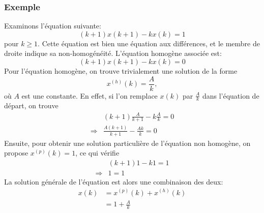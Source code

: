             \subsubsection{Exemple}
                Examinons l’équation suivante:
                \begin{equation}
                    (k+1)x(k+1)-kx(k) = 1
                \end{equation}
                pour $k \geq 1$. Cette équation est bien une équation aux différences, et le membre de droite indique sa non-homogénéité.
                L'équation homogène associée est:
                \begin{equation}
                    (k+1)x(k+1)-kx(k) = 0
                \end{equation}
                Pour l'équation homogène, on trouve trivialement une solution de la forme
                \begin{equation}
                    x^{(h)}(k) = \frac{A}{k},
                \end{equation}
                où $A$ est une constante. En effet, si l'on remplace $x(k)$ par $ \frac{A}{k}$ dans l'équation de départ, on trouve
                \begin{equation}
                    \begin{split}
                        &(k+1)\frac{A}{k+1}-k \frac{A}{k} = 0\\
                        \Rightarrow&\frac{A(k+1)}{k+1}-\frac{Ak}{k} = 0
                    \end{split}
                \end{equation}
                Ensuite, pour obtenir une solution particulière de l’équation non homogène, on propose $x^{(p)}(k) = 1$, ce qui vérifie
                \begin{equation}
                    \begin{split}
                        &(k+1)1-k 1 = 1\\
                        \Rightarrow&1 = 1
                    \end{split}
                \end{equation}
                La solution générale de l’équation est alors une combinaison des deux:
                \begin{equation}
                    \begin{split}
                        x(k) &= x^{(p)}(k)+x^{(h)}(k) \\
                        &= 1+\frac{A}{k}
                    \end{split}
                \end{equation}

